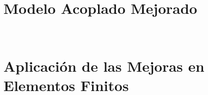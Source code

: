 \section{Modelo Acoplado Mejorado}~\hypertarget{sec:sec750}{}
\label{sec:sec750}



\section{Aplicación de las Mejoras en Elementos Finitos}~\hypertarget{sec:sec760}{}
\label{sec:sec760}



